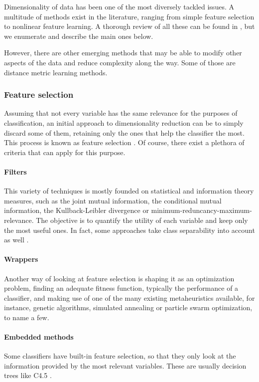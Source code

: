 \documentclass[
	fontsize=11pt, %
	twoside=false, %
	open=any, %
	secnumdepth=1, %
]{kaobook}
\begin{document}
Dimensionality of data has been one of the most diversely tackled issues. A multitude of methods exist in the literature, ranging from simple feature selection to nonlinear feature learning. A thorough review of all these can be found in \cite{garcia2015data}, but we enumerate and describe the main ones below.

However, there are other emerging methods that may be able to modify other aspects of the data and reduce complexity along the way. Some of those are distance metric learning methods.

\subsubsection{Feature selection}

Assuming that not every variable has the same relevance for the purposes of classification, an initial approach to dimensionality reduction can be to simply discard some of them, retaining only the ones that help the classifier the most. This process is known as feature selection \cite{garcia2015data}. Of course, there exist a plethora of criteria that can apply for this purpose.

\paragraph*{Filters} This variety of techniques is mostly founded on statistical and information theory measures, such as the joint mutual information, the conditional mutual information, the Kullback-Leibler divergence or minimum-reduncancy-maximum-relevance. The objective is to quantify the utility of each variable and keep only the most useful ones. In fact, some approaches take class separability into account as well \cite{zhang2013divergence,wang2008feature}.

\paragraph*{Wrappers} Another way of looking at feature selection is shaping it as an optimization problem, finding an adequate fitness function, typically the performance of a classifier, and making use of one of the many existing metaheuristics available, for instance, genetic algorithms, simulated annealing or particle swarm optimization, to name a few.

\paragraph*{Embedded methods} Some classifiers have built-in feature selection, so that they only look at the information provided by the most relevant variables. These are usually decision trees like C4.5 \cite{quinlan}.
\end{document}
